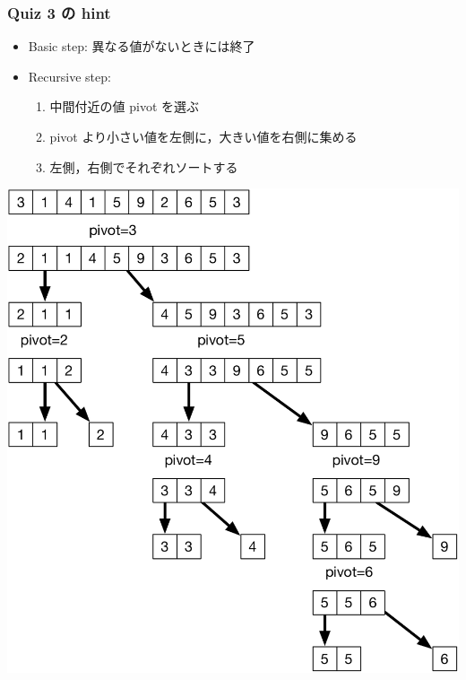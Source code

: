 \begin{frame}[shrink]
\frametitle{Quiz 3 の hint}
  \begin{itemize}
\scriptsize
\item Basic step: 異なる値がないときには終了
\item Recursive step:
    \begin{enumerate}
\scriptsize
\item 中間付近の値 pivot を選ぶ
\item pivot より小さい値を左側に，大きい値を右側に集める
\item 左側，右側でそれぞれソートする
    \end{enumerate}
  \end{itemize}
  \begin{center}
\includegraphics[scale=0.3]{./Figure/quick_sort.pdf}
  \end{center}
\end{frame}
